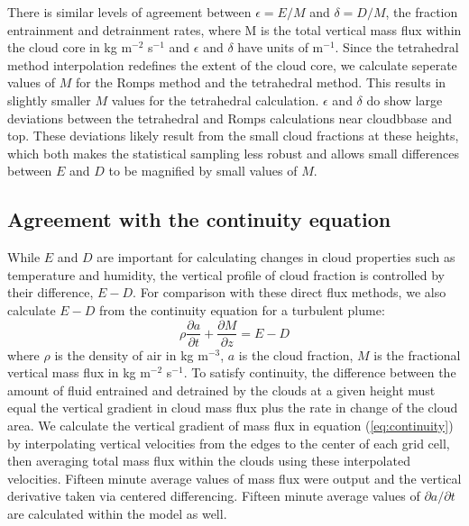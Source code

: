 \documentclass[12pt]{article}
\begin{document}
There is similar levels of agreement between $\epsilon = E/M$ and 
$\delta = D/M$, the fraction entrainment and detrainment rates, where M is the 
total vertical mass flux within the cloud core in kg m$^{-2}$ s$^{-1}$ and 
$\epsilon$ and $\delta$ have units of m$^{-1}$.  Since the tetrahedral method 
interpolation redefines the extent of the cloud core, we calculate seperate 
values of $M$ for the Romps method and the tetrahedral method.  This results in 
slightly smaller $M$ values for the tetrahedral calculation.  $\epsilon$ and 
$\delta$ do show large deviations between the tetrahedral and Romps
calculations near cloudbbase and top.  These deviations likely result from the 
small cloud fractions at these heights, which both makes the statistical 
sampling less robust and allows small differences between $E$ and $D$ to be 
magnified by small values of $M$.  

\subsection{Agreement with the continuity equation}

While $E$ and $D$ are important for calculating changes in cloud properties 
such as temperature and humidity, the vertical profile of cloud fraction is
controlled by their difference, $E-D$.  For comparison with these direct 
flux methods, we also calculate $E-D$ from the continuity equation for a 
turbulent plume: 
\begin{equation}
    \label{eq:continuity}
    \rho \frac{\partial a}{\partial t} 
    + \frac{\partial M}{\partial z}
    = E - D
\end{equation}
where $\rho$ is the density of air in kg m$^{-3}$, $a$ is the cloud fraction, 
$M$ is the fractional vertical mass flux in kg m$^{-2}$ s$^{-1}$.  To satisfy 
continuity, the difference between the amount of fluid entrained and detrained 
by the clouds at a given height must equal the vertical gradient in cloud mass 
flux plus the rate in change of the cloud area.  We calculate the vertical 
gradient of mass flux in equation (\ref{eq:continuity}) by interpolating 
vertical velocities from the edges to the center of each grid cell, then 
averaging total mass flux within the clouds using these interpolated velocities.  
Fifteen minute average values of mass flux were output and the vertical 
derivative taken via centered differencing.  Fifteen minute average values of 
$\partial a/\partial t$ are calculated within the model as well.  
\end{document}
